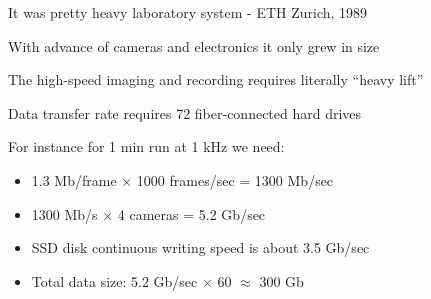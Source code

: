 
\begin{frame}[label=real-1]{It was pretty heavy laboratory system - ETH Zurich, 1989}
    \centering{}
\end{frame}

    
\begin{frame}[label=real-2]{With advance of cameras and electronics it only grew in size}
    \centering{}
\end{frame}

\begin{frame}[label=real-3]{The high-speed imaging and recording requires literally ``heavy lift''}
\begin{multicols}{2}
\end{multicols}
\begin{cardTiny}
    Data transfer rate requires 72 fiber-connected hard drives
\end{cardTiny}
\end{frame}





\begin{frame}[label=real-4]{For instance for 1 min run at 1 kHz we need:}
    \begin{card}
    \begin{itemize}
    \item 1.3 Mb/frame $\times$ 1000 frames/sec = 1300 Mb/sec
    \item 1300 Mb/s $\times$ 4 cameras = 5.2 Gb/sec
    \item SSD disk continuous writing speed is about 3.5 Gb/sec
    \item Total data size: 5.2 Gb/sec $\times$ 60 $\approx$ 300 Gb
    \end{itemize}

    \end{card}
\end{frame}


